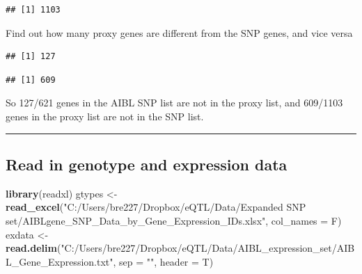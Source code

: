\documentclass[]{article}
\newenvironment{Shaded}{\begin{snugshade}}{\end{snugshade}}
\newcommand{\KeywordTok}[1]{\textcolor[rgb]{0.13,0.29,0.53}{\textbf{#1}}}
\newcommand{\DataTypeTok}[1]{\textcolor[rgb]{0.13,0.29,0.53}{#1}}
\newcommand{\StringTok}[1]{\textcolor[rgb]{0.31,0.60,0.02}{#1}}
\newcommand{\OperatorTok}[1]{\textcolor[rgb]{0.81,0.36,0.00}{\textbf{#1}}}
\newcommand{\NormalTok}[1]{#1}
\begin{document}
\begin{verbatim}
## [1] 1103
\end{verbatim}

Find out how many proxy genes are different from the SNP genes, and vice
versa

\begin{Shaded}
\end{Shaded}

\begin{verbatim}
## [1] 127
\end{verbatim}

\begin{Shaded}
\end{Shaded}

\begin{verbatim}
## [1] 609
\end{verbatim}

So 127/621 genes in the AIBL SNP list are not in the proxy list, and
609/1103 genes in the proxy list are not in the SNP list.

\begin{center}\rule{0.5\linewidth}{\linethickness}\end{center}

\subsection{Read in genotype and expression
data}\label{read-in-genotype-and-expression-data}

\begin{Shaded}
\begin{Highlighting}[]
\KeywordTok{library}\NormalTok{(readxl)}
\NormalTok{gtypes <-}\StringTok{ }\KeywordTok{read_excel}\NormalTok{(}\StringTok{"C:/Users/bre227/Dropbox/eQTL/Data/Expanded SNP set/AIBLgene_SNP_Data_by_Gene_Expression_IDs.xlsx"}\NormalTok{,}
                \DataTypeTok{col_names =}\NormalTok{ F)}
\NormalTok{exdata <-}\StringTok{ }\KeywordTok{read.delim}\NormalTok{(}\StringTok{"C:/Users/bre227/Dropbox/eQTL/Data/AIBL_expression_set/AIBL_Gene_Expression.txt"}\NormalTok{, }\DataTypeTok{sep =} \StringTok{""}\NormalTok{, }\DataTypeTok{header =}\NormalTok{ T)}
\end{Highlighting}
\end{Shaded}
\end{document}
